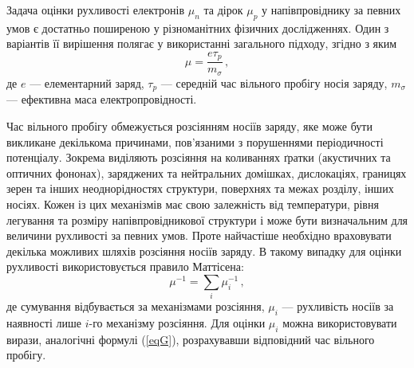 \documentclass[14pt,a4paper,titlepage,oneside]{book}
\numberwithin{equation}{part}
\begin{document}
Задача оцінки рухливості електронів $\mu_n$ та дірок $\mu_p$ у напівпровіднику
за певних умов є достатньо поширеною у різноманітних фізичних дослідженнях.
Один з варіантів її вирішення полягає у використанні загального підходу, згідно з яким
\begin{equation}\label{eqG}
  \mu=\frac{e\tau_p}{m_\sigma}\,,
\end{equation}
де
$e$ --- елементарний заряд,
$\tau_p$ --- середній час вільного пробігу носія заряду,
$m_\sigma$ --- ефективна маса електропровідності.

Час вільного пробігу обмежується розсіянням носіїв заряду, яке може бути викликане декількома причинами,
пов'язаними з порушеннями періодичності потенціалу.
Зокрема виділяють розсіяння на коливаннях ґратки (акустичних та оптичних фононах), заряджених та нейтральних домішках,
дислокаціях, границях зерен та інших неоднорідностях структури, поверхнях та межах розділу, інших носіях.
Кожен із цих механізмів має свою залежність від температури, рівня легування та розміру напівпровідникової структури
і може бути визначальним для величини рухливості за певних умов.
Проте найчастіше необхідно враховувати декілька можливих шляхів розсіяння носіїв заряду.
В такому випадку для оцінки рухливості використовується правило Маттісена:
\begin{equation}\label{eqM}
  \mu^{-1}=\sum_i \mu_i^{-1}\,,
\end{equation}
де
сумування відбувається за механізмами розсіяння,
$\mu_i$ --- рухливість носіїв за наявності лише $i$-го механізму розсіяння.
Для оцінки $\mu_i$ можна використовувати вирази, аналогічні формулі (\ref{eqG}), розрахувавши відповідний час вільного пробігу.
\end{document}
